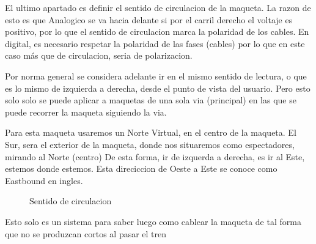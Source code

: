 El ultimo apartado es definir el sentido de circulacion de la maqueta.
La razon de esto es que Analogico se va hacia delante si por el carril derecho
el voltaje es positivo, por lo que el sentido de circulacion marca la polaridad
de los cables. En digital, es necesario respetar la polaridad de las fases (cables)
por lo que en este caso más que de circulacion, seria de polarizacion.

Por norma general se considera adelante ir en el mismo sentido de lectura, o que es
lo mismo de izquierda a derecha, desde el punto de vista del usuario. Pero esto solo
solo se puede aplicar a maquetas de una sola via (principal) en las que se puede
recorrer la maqueta siguiendo la via.

Para esta maqueta usaremos un Norte Virtual, en el centro de la maqueta. El Sur, sera
el exterior de la maqueta, donde nos situaremos como espectadores, mirando al Norte (centro)
De esta forma, ir de izquerda a derecha, es ir al Este, estemos donde estemos.
Esta direciccion de Oeste a Este se conoce como Eastbound en ingles.

\begin{figure}[H]
    \centering
    
    \caption{Sentido de circulacion}
    \label{fig:Sentidos}
\end{figure}

Esto solo es un sistema para saber luego como cablear la maqueta de tal forma
que no se produzcan cortos al pasar el tren 
